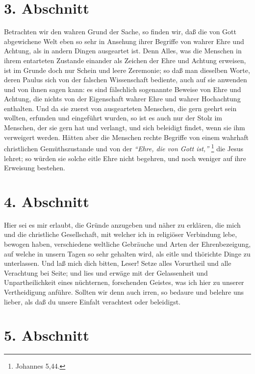 \section{3. Abschnitt} \label{kap9_ab3}

Betrachten wir den wahren Grund der Sache, so finden wir, daß die von Gott
abgewichene Welt eben so sehr in Ansehung ihrer Begriffe von wahrer Ehre und
Achtung, als in andern Dingen ausgeartet ist. Denn Alles, was die Menschen in
ihrem entarteten Zustande einander als Zeichen der Ehre und Achtung erweisen,
ist im Grunde doch nur Schein und leere Zeremonie; so daß man dieselben Worte,
deren Paulus sich von der falschen Wissenschaft bediente, auch auf sie
anwenden und von ihnen sagen kann: es sind fälschlich sogenannte Beweise von
Ehre und Achtung, die nichts von der Eigenschaft wahrer Ehre und wahrer
Hochachtung enthalten. Und da sie zuerst von ausgearteten Menschen, die gern
geehrt sein wollten, erfunden und eingeführt wurden, so ist es auch nur der
Stolz im Menschen, der sie gern hat und verlangt, und sich beleidigt findet,
wenn sie ihm verweigert werden. Hätten aber die Menschen rechte Begriffe von
einem wahrhaft christlichen Gemüthszustande und von der
\textit{"`Ehre, die von Gott ist,"'}
\footnote{Johannes 5,44.}
die Jesus lehret; so würden sie solche eitle
Ehre nicht begehren, und noch weniger auf ihre Erweisung bestehen.

\section{4. Abschnitt} \label{kap9_ab4}
Hier sei es mir erlaubt, die Gründe anzugeben und näher zu erklären, die mich
und die christliche Gesellschaft, mit welcher ich in religiöser Verbindung lebe,
bewogen haben, verschiedene weltliche Gebräuche und Arten der Ehrenbezeigung,
auf welche in unsern Tagen so sehr gehalten wird, als eitle und thörichte Dinge
zu unterlassen. Und laß mich dich bitten, Leser! Setze alles Vorurtheil und alle
Verachtung bei Seite; und lies und erwäge mit der Gelassenheit und
Unpartheilichkeit eines nüchternen, forschenden Geistes, was ich hier zu unserer
Vertheidigung anführe. Sollten wir denn auch irren, so bedaure und belehre uns
lieber, als daß du unsere Einfalt verachtest oder beleidigst.

\section{5. Abschnitt} \label{kap9_ab5}

